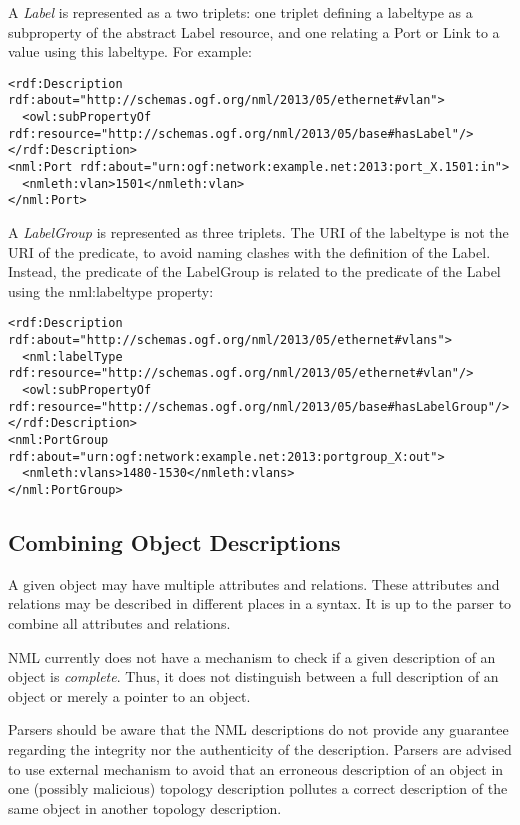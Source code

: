 A \emph{Label} is represented as a two triplets: one triplet defining a labeltype as a subproperty of the abstract Label resource, and one relating a Port or Link to a value using this labeltype.  For example:

\begin{lstlisting}
<rdf:Description rdf:about="http://schemas.ogf.org/nml/2013/05/ethernet#vlan">
  <owl:subPropertyOf rdf:resource="http://schemas.ogf.org/nml/2013/05/base#hasLabel"/>
</rdf:Description>
<nml:Port rdf:about="urn:ogf:network:example.net:2013:port_X.1501:in">
  <nmleth:vlan>1501</nmleth:vlan>
</nml:Port>
\end{lstlisting}

A \emph{LabelGroup} is represented as three triplets. The URI of the labeltype is not the URI of the predicate, to avoid naming clashes with the definition of the Label. Instead, the predicate of the LabelGroup is related to the predicate of the Label using the nml:labeltype property:
\begin{lstlisting}
<rdf:Description rdf:about="http://schemas.ogf.org/nml/2013/05/ethernet#vlans">
  <nml:labelType rdf:resource="http://schemas.ogf.org/nml/2013/05/ethernet#vlan"/>
  <owl:subPropertyOf rdf:resource="http://schemas.ogf.org/nml/2013/05/base#hasLabelGroup"/>
</rdf:Description>
<nml:PortGroup rdf:about="urn:ogf:network:example.net:2013:portgroup_X:out">
  <nmleth:vlans>1480-1530</nmleth:vlans>
</nml:PortGroup>
\end{lstlisting}





\subsection{Combining Object Descriptions} %
\label{sub:combining_descriptions}

A given object may have multiple attributes and relations. These attributes 
and relations may be described in different places in a syntax. It is up to 
the parser to combine all attributes and relations.

NML currently does not have a mechanism to check if a given description of an 
object is \emph{complete}. Thus, it does not distinguish between a full description 
of an object or merely a pointer to an object.


Parsers should be aware that the NML descriptions do not provide any guarantee 
regarding the integrity nor the authenticity of the description. Parsers are 
advised to use external mechanism to avoid that an erroneous description of an 
object in one (possibly malicious) topology description pollutes a correct 
description of the same object in another topology description.

